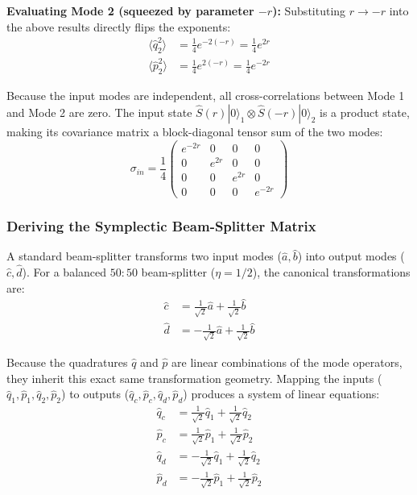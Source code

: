 {\textbf{Evaluating Mode 2 (squeezed by parameter $-r$):}
Substituting $r \to -r$ into the above results directly flips the exponents:
\begin{align*}
\langle\hat{q}_2^2\rangle &= \frac{1}{4}e^{-2(-r)} = \frac{1}{4}e^{2r} \\
\langle\hat{p}_2^2\rangle &= \frac{1}{4}e^{2(-r)} = \frac{1}{4}e^{-2r}
\end{align*}

Because the input modes are independent, all cross-correlations between Mode 1 and Mode 2 are zero. The input state $\hat{S}(r)|0\rangle_1 \otimes \hat{S}(-r)|0\rangle_2$ is a product state, making its covariance matrix a block-diagonal tensor sum of the two modes:
\begin{equation*}
\sigma_{in} = \frac{1}{4} \begin{pmatrix} e^{-2r} & 0 & 0 & 0 \\ 0 & e^{2r} & 0 & 0 \\ 0 & 0 & e^{2r} & 0 \\ 0 & 0 & 0 & e^{-2r} \end{pmatrix}
\end{equation*}

\subsubsection{Deriving the Symplectic Beam-Splitter Matrix }
A standard beam-splitter transforms two input modes ($\hat{a}, \hat{b}$) into output modes ($\hat{c}, \hat{d}$). For a balanced $50{:}50$ beam-splitter ($\eta = 1/2$), the canonical transformations are:
\begin{align*}
\hat{c} &= \frac{1}{\sqrt{2}}\hat{a} + \frac{1}{\sqrt{2}}\hat{b} \\
\hat{d} &= -\frac{1}{\sqrt{2}}\hat{a} + \frac{1}{\sqrt{2}}\hat{b}
\end{align*}

Because the quadratures $\hat{q}$ and $\hat{p}$ are linear combinations of the mode operators, they inherit this exact same transformation geometry. Mapping the inputs ($\hat{q}_1, \hat{p}_1, \hat{q}_2, \hat{p}_2$) to outputs ($\hat{q}_c, \hat{p}_c, \hat{q}_d, \hat{p}_d$) produces a system of linear equations:
\begin{align*}
\hat{q}_c &= \frac{1}{\sqrt{2}}\hat{q}_1 + \frac{1}{\sqrt{2}}\hat{q}_2 \\
\hat{p}_c &= \frac{1}{\sqrt{2}}\hat{p}_1 + \frac{1}{\sqrt{2}}\hat{p}_2 \\
\hat{q}_d &= -\frac{1}{\sqrt{2}}\hat{q}_1 + \frac{1}{\sqrt{2}}\hat{q}_2 \\
\hat{p}_d &= -\frac{1}{\sqrt{2}}\hat{p}_1 + \frac{1}{\sqrt{2}}\hat{p}_2
\end{align*}

}
